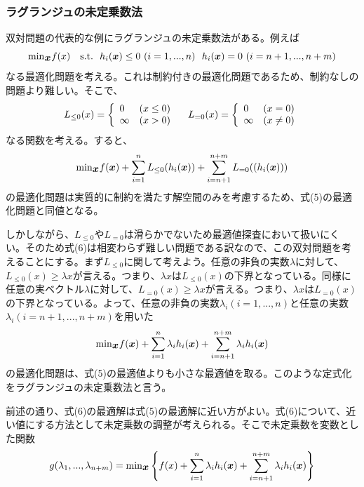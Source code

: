 \documentclass[dvipdfmx, 9pt, a4paper]{jsarticle}
\newcommand{\bm}[1]{{\mbox{\boldmath $#1$}}}
\begin{document}
\subsubsection{ラグランジュの未定乗数法}
双対問題の代表的な例にラグランジュの未定乗数法がある。例えば
\begin{equation}
{\rm min}_{\bm x}f(x)~~~{\rm s.t.}~~h_i(\bm x) \leq 0~(i=1, ..., n)~~h_i(\bm x)=0~(i=n+1, ...,n+m)
\end{equation}
なる最適化問題を考える。これは制約付きの最適化問題であるため、制約なしの問題より難しい。そこで、
\begin{equation}
L_{\leq 0}(x)=
\left\{
\begin{array}{ll}
0&(x \leq 0) \\
\infty & (x>0)
\end{array}\right.~~~
L_{= 0}(x)=
\left\{
\begin{array}{ll}
0&(x = 0) \\
\infty & (x\neq0)
\end{array}\right. \notag
\end{equation}
なる関数を考える。すると、
\begin{equation}
{\rm min}_{\bm x}f(\bm x)+\sum_{i=1}^nL_{\leq 0}(h_i(\bm x))+\sum_{i=n+1}^{n+m}L_{=0}((h_i(\bm x)))
\end{equation}
の最適化問題は実質的に制約を満たす解空間のみを考慮するため、式(5)の最適化問題と同値となる。\par
しかしながら、$L_{\leq 0}$や$L_{=0}$は滑らかでないため最適値探査において扱いにくい。そのため式(6)は相変わらず難しい問題である訳なので、この双対問題を考えることにする。まず$L_{\leq 0}$に関して考えよう。任意の非負の実数$\lambda$に対して、$L_{\leq 0}(x) \geq \lambda x$が言える。つまり、$\lambda x$は$L_{\leq 0}(x)$の下界となっている。同様に任意の実ベクトル$\lambda$に対して、$L_{=0}(x) \geq \lambda x$が言える。つまり、$\lambda x$は$L_{=0}(x)$の下界となっている。よって、任意の非負の実数$\lambda_i(i=1, ..., n)$と任意の実数$\lambda_i(i=n+1,...,n+m)$を用いた
\begin{equation}
{\rm min}_{\bm x}f(\bm x)+\sum_{i=1}^n\lambda_ih_i(\bm x)+\sum_{i=n+1}^{n+m}\lambda_ih_i(\bm x) \notag
\end{equation}
の最適化問題は、式(5)の最適値よりも小さな最適値を取る。このような定式化をラグランジュの未定乗数法と言う。\par
前述の通り、式(6)の最適解は式(5)の最適解に近い方がよい。式(6)について、近い値にする方法として未定乗数の調整が考えられる。そこで未定乗数を変数とした関数
\begin{equation}
g(\lambda_1, ..., \lambda_{n+m})={\rm min}_{\bm x}\left\{ f(x)+\sum_{i=1}^n\lambda_ih_i(\bm x)+\sum_{i=n+1}^{n+m}\lambda_ih_i(\bm x) \right\} \notag
\end{equation}
\end{document}
